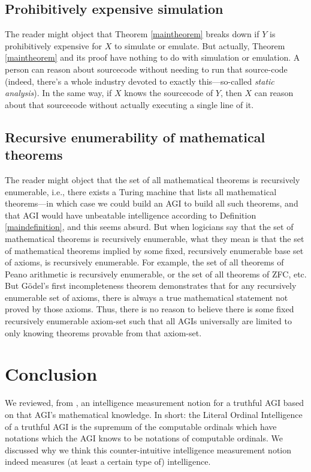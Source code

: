 \documentclass[runningheads]{llncs}
\begin{document}
\subsection{Prohibitively expensive simulation}

The reader might object that Theorem \ref{maintheorem} breaks down if $Y$ is prohibitively
expensive for $X$ to simulate or emulate. But actually, Theorem \ref{maintheorem} and its
proof have nothing to do with simulation or emulation. A person can reason about sourcecode
without needing to run that source-code (indeed, there's a whole industry devoted to
exactly this---so-called \emph{static analysis}). In the same way, if $X$ knows the sourcecode
of $Y$, then $X$ can reason about that sourcecode without actually executing a single line
of it.

\subsection{Recursive enumerability of mathematical theorems}

The reader might object that the set of all mathematical theorems is recursively enumerable,
i.e., there exists a Turing machine that lists all mathematical theorems---in which case we
could build an AGI to build all such theorems, and that AGI would have unbeatable intelligence
according to Definition \ref{maindefinition}, and this seems absurd.
But when logicians say that the set of mathematical theorems is recursively enumerable,
what they mean is that the set of mathematical theorems implied by some fixed, recursively
enumerable base set of axioms, is recursively enumerable. For example, the set of all
theorems of Peano arithmetic is recursively enumerable, or the set of all theorems of
ZFC, etc. But G\"odel's first incompleteness theorem demonstrates that for any recursively
enumerable set of axioms, there is always a true mathematical statement not proved by
those axioms. Thus, there is no reason to believe there is some fixed recursively enumerable
axiom-set such that all AGIs universally are limited to only knowing theorems provable
from that axiom-set.

\section{Conclusion}
\label{conclusionsection}

We reviewed, from \cite{alexander2019measuring}, an intelligence measurement notion
for a truthful AGI based on that AGI's mathematical knowledge.
In short: the Literal Ordinal Intelligence of a truthful AGI is the supremum of the
computable ordinals which have notations which the AGI knows to be notations of
computable ordinals. We discussed why we think this counter-intuitive intelligence
measurement notion indeed measures (at least a certain type of) intelligence.
\end{document}

